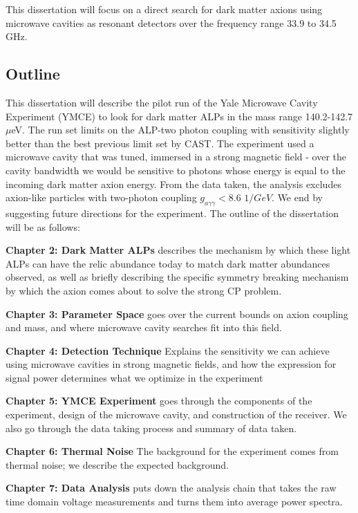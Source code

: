 \documentclass[12pt,twosides]{book}
\begin{document}
This dissertation will focus on a direct search for dark matter axions using microwave cavities as resonant detectors over the frequency range 33.9 to 34.5 GHz.

\subsection{Outline}

This dissertation will describe the pilot run of the Yale Microwave Cavity Experiment (YMCE) to look for dark matter ALPs in the mass range 140.2-142.7 $\mu$eV. The run set limits on the ALP-two photon coupling with sensitivity slightly better than the best previous limit set by CAST. The experiment used a microwave cavity that was tuned, immersed in a strong magnetic field - over the cavity bandwidth we would be sensitive to photons whose energy is equal to the incoming dark matter axion energy.  From the data taken, the analysis excludes axion-like particles with two-photon coupling $g_{a\gamma\gamma} < 8.6$ $1/GeV$. We end by suggesting future directions for the experiment.
The outline of the dissertation will be as follows:

\textbf{Chapter 2: Dark Matter ALPs} describes the mechanism by which these light ALPs can have the relic abundance today to match dark matter abundances observed, as well as briefly describing the specific symmetry breaking mechanism by which the axion comes about to solve the strong CP problem.

\textbf{Chapter 3: Parameter Space} goes over the current bounds on axion coupling and mass, and where microwave cavity searches fit into this field.

\textbf{Chapter 4: Detection Technique} Explains the sensitivity we can achieve using microwave cavities in strong magnetic fields, and how the expression for signal power determines what we optimize in the experiment

\textbf{Chapter 5: YMCE Experiment} goes through the components of the experiment, design of the microwave cavity, and construction of the receiver. We also go through the data taking process and summary of data taken.

\textbf{Chapter 6: Thermal Noise} The background for the experiment comes from thermal noise; we describe the expected background.

\textbf{Chapter 7: Data Analysis} puts down the analysis chain that takes the raw time domain voltage measurements and turns them into average power spectra. 
\end{document}

